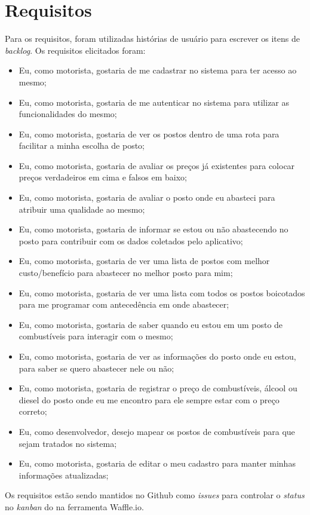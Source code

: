 \section{Requisitos}

Para os requisitos, foram utilizadas histórias de usuário para escrever os itens de \textit{backlog}. Os requisitos elicitados foram:
\begin{itemize}
    \item Eu, como motorista, gostaria de me cadastrar no sistema para ter acesso ao mesmo;
    \item Eu, como motorista, gostaria de me autenticar no sistema para utilizar as funcionalidades do mesmo;
    \item Eu, como motorista, gostaria de ver os postos dentro de uma rota para facilitar a minha escolha de posto;
    \item Eu, como motorista, gostaria de avaliar os preços já existentes para colocar preços verdadeiros em cima e falsos em baixo;
    \item Eu, como motorista, gostaria de avaliar o posto onde eu abasteci para atribuir uma qualidade ao mesmo;
    \item Eu, como motorista, gostaria de informar se estou ou não abastecendo no posto para contribuir com os dados coletados pelo aplicativo;
    \item Eu, como motorista, gostaria de ver uma lista de postos com melhor custo/benefício para abastecer no melhor posto para mim;
    \item Eu, como motorista, gostaria de ver uma lista com todos os postos boicotados para me programar com antecedência em onde abastecer;
    \item Eu, como motorista, gostaria de saber quando eu estou em um posto de combustíveis para interagir com o mesmo;
    \item Eu, como motorista, gostaria de ver as informações do posto onde eu estou, para saber se quero abastecer nele ou não;
    \item Eu, como motorista, gostaria de registrar o preço de combustíveis, álcool ou diesel do posto onde eu me encontro para ele sempre estar com o preço correto;
    \item Eu, como desenvolvedor, desejo mapear os postos de combustíveis para que sejam tratados no sistema;
    \item Eu, como motorista, gostaria de editar o meu cadastro para manter minhas informações atualizadas;
\end{itemize}
Os requisitos estão sendo mantidos no Github como \textit{issues} para controlar o \textit{status} no \textit{kanban} do  na ferramenta Waffle.io.
